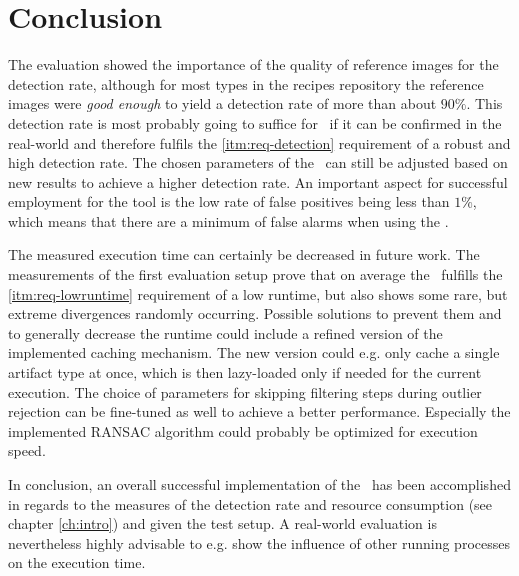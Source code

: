 \chapter{Conclusion}\label{ch:conclusion}

The evaluation showed the importance of the quality of reference images for the detection rate, although for most types in the recipes repository the reference images were \emph{good enough} to yield a detection rate of more than about $90\%$. This detection rate is most probably going to suffice for \ape~if it can be confirmed in the real-world and therefore fulfils the \ref{itm:req-detection} requirement of a robust and high detection rate. The chosen parameters of the \vd~can still be adjusted based on new results to achieve a higher detection rate. An important aspect for successful employment for the tool is the low rate of false positives being less than $1\%$, which means that there are a minimum of false alarms when using the \vd.

The measured execution time can certainly be decreased in future work. The measurements of the first evaluation setup prove that on average the \vd~fulfills the \ref{itm:req-lowruntime} requirement of a low runtime, but also shows some rare, but extreme divergences randomly occurring. Possible solutions to prevent them and to generally decrease the runtime could include a refined version of the implemented caching mechanism. The new version could e.g. only cache a single artifact type at once, which is then lazy-loaded only if needed for the current execution. The choice of parameters for skipping filtering steps during outlier rejection can be fine-tuned as well to achieve a better performance. Especially the implemented RANSAC algorithm could probably be optimized for execution speed.

In conclusion, an overall successful implementation of the \vd~has been accomplished in regards to the measures of the detection rate and resource consumption (see chapter \ref{ch:intro}) and given the test setup. A real-world evaluation is nevertheless highly advisable to e.g. show the influence of other running processes on the execution time.
